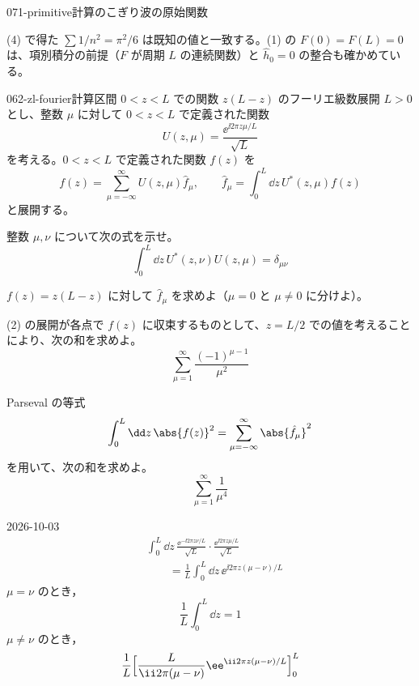 \documentclass[uplatex,dvipdfmx,a4paper,11pt]{jsarticle}
\begin{document}
\begin{mondai}{071-primitive}{計算}{のこぎり波の原始関数}
\begin{tadashii}
\[\]
\kenzan (4) で得た $\sum1/n^{2}=\pi^{2}/6$ は既知の値と一致する。(1) の $F(0)=F(L)=0$ は、項別積分の前提（$F$ が周期 $L$ の連続関数）と $\hat{h}_0=0$ の整合も確かめている。
\end{tadashii}
\end{mondai}

\begin{mondai}{062-zl-fourier}{計算}{区間 $0<z<L$ での関数 $z(L-z)$ のフーリエ級数展開}
$L>0$ とし、整数 $\mu$ に対して $0<z<L$ で定義された関数
\[
U(z,\mu)=\frac{\ee^{\ii2\pi z\mu/L}}{\sqrt{L}}
\]
を考える。$0<z<L$ で定義された関数 $f(z)$ を
\[
f(z)=\sum_{\mu=-\infty}^{\infty}U(z,\mu)\hat{f}_{\mu},\qquad \hat{f}_{\mu}=\int_{0}^{L}\dd z\,U^{*}(z,\mu)f(z)
\]
と展開する。
\begin{shoumon}
  \item 整数 $\mu,\nu$ について次の式を示せ。
\[
\int_{0}^{L}\dd z\,U^{*}(z,\nu)U(z,\mu)=\delta_{\mu\nu}
\]
  \item $f(z)=z(L-z)$ に対して $\hat{f}_{\mu}$ を求めよ（$\mu=0$ と $\mu\neq0$ に分けよ）。
  \item (2) の展開が各点で $f(z)$ に収束するものとして、$z=L/2$ での値を考えることにより、次の和を求めよ。
\[
\sum_{\mu=1}^{\infty}\frac{(-1)^{\mu-1}}{\mu^{2}}
\]
  \item Parseval の等式
\[
\int_{0}^{L}\dd z\,\abs{f(z)}^{2}=\sum_{\mu=-\infty}^{\infty}\abs{\hat{f}_{\mu}}^{2}
\]
を用いて、次の和を求めよ。
\[
\sum_{\mu=1}^{\infty}\frac{1}{\mu^{4}}
\]
\end{shoumon}
\begin{kotaeutsushi}{2026-10-03}
\begin{align*}
  &\int_{0}^{L}\dd z\,\frac{\ee^{-\ii2\pi z\nu/L}}{\sqrt{L}}\cdot\frac{\ee^{\ii2\pi z\mu/L}}{\sqrt{L}}\\
  &\qquad=\frac{1}{L}\int_{0}^{L}\dd z\,\ee^{\ii2\pi z(\mu-\nu)/L}
\end{align*}
$\mu=\nu$ のとき，
\[ \frac{1}{L}\int_{0}^{L}\dd z=1 \]
$\mu\neq\nu$ のとき，
\begin{align*}
  &\frac{1}{L}\Bigl[\frac{L}{\ii2\pi(\mu-\nu)}\ee^{\ii2\pi z(\mu-\nu)/L}\Bigr]_{0}^{L}\\

\end{align*}
\end{kotaeutsushi}
\end{mondai}
\end{document}
